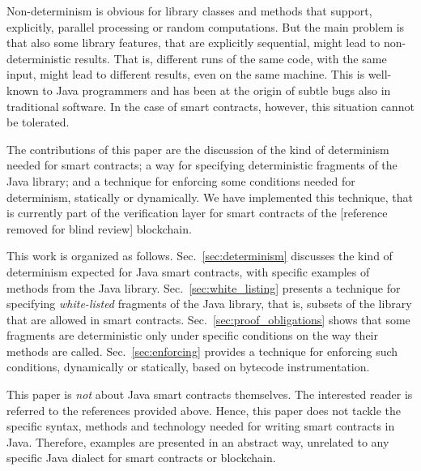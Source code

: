 Non-determinism is obvious for library classes and methods that support, explicitly,
parallel processing or random computations. But the main problem is that
also some library features, that are explicitly sequential, might lead to
non-deterministic results. That is, different runs of the same code, with the
same input, might lead to different results, even on the same machine.
This is well-known to Java programmers and has been at the origin of subtle
bugs also in traditional software. In the case of smart contracts, however,
this situation cannot be tolerated.

The contributions of this paper are the discussion of the kind of determinism
needed for smart contracts; a way for specifying deterministic fragments
of the Java library; and a technique for
enforcing some conditions needed for determinism, statically or dynamically.
We have implemented this technique, that is currently part of the verification
layer for smart contracts of the [reference removed for blind review] blockchain.

This work is organized as follows.
Sec.~\ref{sec:determinism} discusses the kind of determinism expected for Java smart contracts,
with specific examples of methods from the Java library.
Sec.~\ref{sec:white_listing} presents a technique for specifying \emph{white-listed} fragments of the Java library,
that is, subsets of the library that are allowed in smart contracts.
Sec.~\ref{sec:proof_obligations} shows that
some fragments are deterministic only under specific conditions on the way their methods
are called.
Sec.~\ref{sec:enforcing} provides a technique for enforcing such conditions, dynamically
or statically, based on bytecode instrumentation.

This paper is \emph{not} about Java smart contracts themselves. The interested reader
is referred to the references provided above. Hence, this paper does not tackle
the specific syntax, methods and technology needed for writing smart contracts in Java.
Therefore, examples are presented in an abstract way, unrelated to any specific
Java dialect for smart contracts or blockchain.
